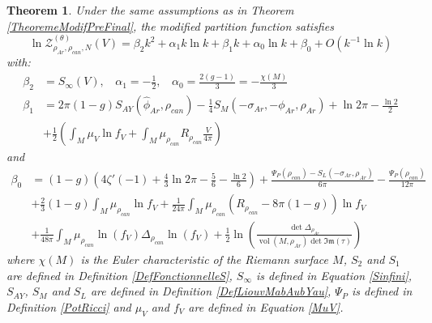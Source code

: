 \documentclass{article}
\newtheorem{theorem}{Theorem}[section]
\theoremstyle{definition}
\theoremstyle{remark}
\DeclareMathOperator{\vol}{vol}
\begin{document}
\begin{theorem}\label{TheoremFinalK}
Under the same assumptions as in Theorem \ref{TheoremeModifPreFinal}, the modified partition function satisfies    \begin{equation}
        \ln \mathcal{Z}_{\rho_{Ar},\rho_{can},N}^{(\theta)}(V)=\beta_{2}k^{2}+\alpha_{1}k\ln k+\beta_{1} k+\alpha_{0}\ln k+\beta_{0}+O(k^{-1}\ln k)
    \end{equation}
    with: 
    \begin{align*}
        \beta_{2}&=S_{\infty}(V),~~~~\alpha_{1}=-\frac{1}{2},~~~~\alpha_{0}=\frac{2(g-1)}{3}=-\frac{\chi(M)}{3} \\\beta_{1}&=2\pi(1-g)S_{AY}(\hat{\phi}_{Ar},\rho_{can})-\frac{1}{4}S_{M}(-\sigma_{Ar},-\phi_{Ar},\rho_{Ar})+\ln2\pi-\frac{\ln2}{2}\\[1.2mm]&+\frac{1}{2}\left(\int_{M}\mu_{V}\ln f_{V}+\int_{M}\mu_{\rho_{can}}R_{\rho_{can}}\frac{V}{4\pi} \right)
    \end{align*}
        and 
\begin{align*}
            \beta_{0}&=(1-g)\left(4\zeta'(-1) +\frac{4}{3}\ln2\pi -\frac{5}{6}-\frac{\ln2}{6}\right)+\frac{\Psi_{P}(\rho_ {can})-S_{L}(-\sigma_{Ar},\rho_{Ar})}{6\pi}-\frac{\Psi_{P}(\rho_{can})}{12\pi}\\[1.5mm]&+\frac{2}{3}(1-g)\int_{M}\mu_{\rho_{can}}\ln f_{V} +\frac{1}{24\pi}\int_{M}\mu_{\rho_{can}}\left(R_{\rho_{can}}-8\pi(1-g) \right)\ln f_{V}\\[1.5mm]&+\frac{1}{48\pi}\int_{M}\mu_{\rho_{can}}\ln (f_{V})\Delta_{\rho_{can}}\ln \left(f_{V} \right)+\frac{1}{2}\ln \left(\frac{\det\Delta_{\rho_{Ar}}}{\vol(M,\rho_{Ar})\det \mathfrak{Im}(\tau)} \right)
        \end{align*}
where $\chi(M)$ is the Euler characteristic of the Riemann surface $M$, $S_{2}$ and $S_{1}$ are defined in Definition \ref{DefFonctionnelleS}, $S_{\infty}$ is defined in Equation \eqref{Sinfini}, $S_{AY}$, $S_{M}$ and $S_{L}$ are defined in Definition \ref{DefLiouvMabAubYau}, $\Psi_{P}$ is defined in Definition \ref{PotRicci} and $\mu_{V}$ and $f_{V}$ are defined in Equation \eqref{MuV}. 
\end{theorem}
\end{document}
